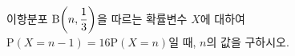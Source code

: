 이항분포 $\mathrm{B}\!\left(n{,}\mkern3mu\mathopen{}\dfrac{1}{3}\right)$을 따르는 확률변수 $X$에 대하여 $\mathrm{P}(X=n-1)=16\mathrm{P}(X=n)$일 때, $n$의 값을 구하시오.
